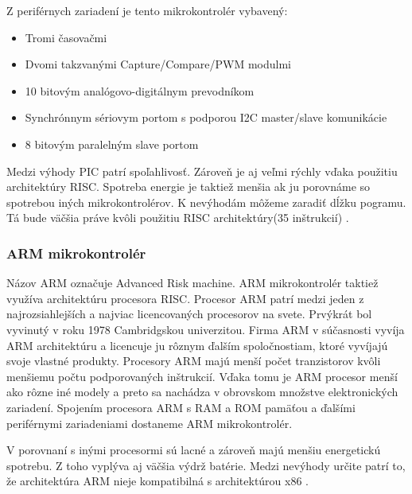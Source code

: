 Z periférnych zariadení je tento mikrokontrolér vybavený:
\begin{itemize}
    \item Tromi časovačmi
    \item Dvomi takzvanými Capture/Compare/PWM modulmi
    \item 10 bitovým analógovo-digitálnym prevodníkom
    \item Synchrónnym sériovym portom s podporou I2C master/slave komunikácie
    \item 8 bitovým paralelným slave portom
\end{itemize}

Medzi výhody PIC patrí spoľahlivosť. Zároveň je aj veľmi rýchly vďaka použitiu architektúry RISC.
Spotreba energie je taktiež menšia ak ju porovnáme so spotrebou iných mikrokontrolérov. K nevýhodám môžeme zaradiť dĺžku pogramu. Tá bude väčšia práve kvôli použitiu RISC architektúry(35 inštrukcií) \cite{shidlingDifferentTypesMicrocontrollers2020}.

\subsubsection{ARM mikrokontrolér}
\noindent
Názov ARM označuje Advanced Risk machine. ARM mikrokontrolér taktiež využíva architektúru procesora RISC. Procesor ARM patrí medzi jeden z najrozsiahlejších
a najviac licencovaných procesorov na svete. Prvýkrát bol vyvinutý v roku 1978 Cambridgskou univerzitou. Firma ARM v súčasnosti vyvíja ARM architektúru a
licencuje ju rôznym ďalším spoločnostiam, ktoré vyvíjajú svoje vlastné produkty.
Procesory ARM majú menší počet tranzistorov kvôli menšiemu počtu podporovaných inštrukcií. Vďaka tomu je ARM procesor menší ako rôzne iné modely a preto sa nachádza v obrovskom množstve elektronických zariadení. Spojením procesora ARM
s RAM a ROM pamäťou a ďalšími periférnymi zariadeniami dostaneme ARM mikrokontrolér.\par

V porovnaní s inými procesormi sú lacné a zároveň majú menšiu energetickú spotrebu. Z toho vyplýva aj väčšia výdrž batérie. Medzi nevýhody určite patrí to, že architektúra ARM nieje kompatibilná s architektúrou x86 \cite{shidlingDifferentTypesMicrocontrollers2020}.

